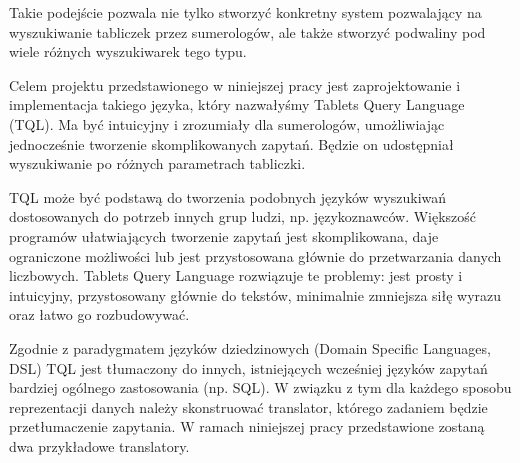 Takie podejście pozwala nie tylko stworzyć konkretny system pozwalający na wyszukiwanie tabliczek przez sumerologów, ale także stworzyć podwaliny pod wiele różnych wyszukiwarek tego typu. %



Celem projektu przedstawionego w niniejszej pracy jest zaprojektowanie i implementacja takiego języka, który nazwałyśmy Tablets Query Language (TQL). Ma być intuicyjny i zrozumiały dla sumerologów, umożliwiając jednocześnie tworzenie skomplikowanych zapytań.
Będzie on udostępniał wyszukiwanie po różnych parametrach tabliczki. 

TQL może być podstawą do tworzenia podobnych języków wyszukiwań dostosowanych do potrzeb innych grup ludzi, np. językoznawców.
Większość programów ułatwiających tworzenie zapytań jest skomplikowana, daje ograniczone możliwości lub jest przystosowana głównie do przetwarzania danych liczbowych. Tablets Query Language rozwiązuje te problemy: jest prosty i intuicyjny, przystosowany głównie do tekstów, minimalnie zmniejsza siłę wyrazu oraz łatwo go rozbudowywać. 


Zgodnie z paradygmatem języków dziedzinowych (Domain Specific Languages, DSL) TQL jest tłumaczony do innych, istniejących wcześniej języków zapytań bardziej ogólnego zastosowania (np. SQL).
W związku z tym dla każdego sposobu reprezentacji danych należy skonstruować translator, 
którego zadaniem będzie przetłumaczenie zapytania. 
W ramach niniejszej pracy przedstawione zostaną dwa przykładowe translatory.

